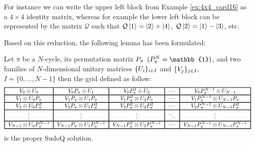 \documentclass[11pt]{article}
\begin{document}
For instance we can write the upper left block from Example \ref{ex:4x4_card16} as a $4\times 4$ identity matrix, whereas for example the lower left block can be represented by the matrix $\mathcal{Q}$ such that $\mathcal{Q}\ket{1}=\ket{2}+\ket{4}$, $\mathcal{Q}\ket{2}=\ket{1}-\ket{3}$, etc.

Based on this reduction, the following lemma has been formulated:

 \begin{lemma}\label{biglemma}
    Let $\pi$ be a $N$-cycle, its permutation matrix $\mathnormal{P}_\pi$ $(\mathnormal{P}_\pi^N=\mathbb{1})$, and two families of $N$-dimensional unitary matrices $\{\mathnormal{U}_i\}_{i\in I}$ and $\{\mathnormal{V}_j\}_{j\in I}$, $I=\{0,\ldots,N-1\}$ then the grid defined as follow:
    \[
    \begin{tabular}{!{\vrule width 1pt}c!{\vrule width 1pt}c!{\vrule width 1pt}c!{\vrule width 1pt}c!{\vrule width 1pt}c!{\vrule width 1pt}}
    \noalign{\hrule height 1pt}
    $\mathnormal{V}_0\otimes\mathnormal{U}_0$ & $\mathnormal{V}_0\mathnormal{P}_\pi\otimes\mathnormal{U}_1$ & $\mathnormal{V}_0\mathnormal{P}_\pi^2\otimes\mathnormal{U}_2$ & $\cdots$ & $\mathnormal{V}_0\mathnormal{P}_\pi^{N-1}\otimes\mathnormal{U}_{N-1}$ \tabularnewline
    \noalign{\hrule height 1pt}
    $\mathnormal{V}_1\otimes\mathnormal{U}_0\mathnormal{P}_\pi$ & $\mathnormal{V}_1\mathnormal{P}_\pi\otimes\mathnormal{U}_1\mathnormal{P}_\pi$ & $\mathnormal{V}_1\mathnormal{P}_\pi^2\otimes\mathnormal{U}_2\mathnormal{P}_\pi$ & $\cdots$ & $\mathnormal{V}_1\mathnormal{P}_\pi^{N-1}\otimes\mathnormal{U}_{N-1}\mathnormal{P}_\pi$ \tabularnewline
    \noalign{\hrule height 1pt}
    $\mathnormal{V}_2\otimes\mathnormal{U}_0\mathnormal{P}_\pi^2$ & $\mathnormal{V}_2\mathnormal{P}_\pi\otimes\mathnormal{U}_1\mathnormal{P}_\pi^2$ & $\mathnormal{V}_2\mathnormal{P}_\pi^2\otimes\mathnormal{U}_2\mathnormal{P}_\pi^2$ & $\cdots$ & $\mathnormal{V}_2\mathnormal{P}_\pi^{N-1}\otimes\mathnormal{U}_{N-1}\mathnormal{P}_\pi^2$ \tabularnewline
    \noalign{\hrule height 1pt}
    $\vdots$ & $\vdots$ & $\vdots$ & $\ddots$ & $\vdots$ \tabularnewline
    \noalign{\hrule height 1pt}
    $\mathnormal{V}_{N-1}\otimes\mathnormal{U}_0\mathnormal{P}_\pi^{N-1}$ & $\mathnormal{V}_{N-1}\mathnormal{P}_\pi\otimes\mathnormal{U}_1\mathnormal{P}_\pi^{N-1}$ & $\mathnormal{V}_{N-1}\mathnormal{P}_\pi^2\otimes\mathnormal{U}_2\mathnormal{P}_\pi^{N-1}$ & $\cdots$ & $\mathnormal{V}_{N-1}\mathnormal{P}_\pi^{N-1}\otimes\mathnormal{U}_{N-1}\mathnormal{P}_\pi^{N-1}$ \tabularnewline
    \noalign{\hrule height 1pt}
    \end{tabular}
    \]
    is the proper SudoQ solution.
    \end{lemma}
    
\end{document}
